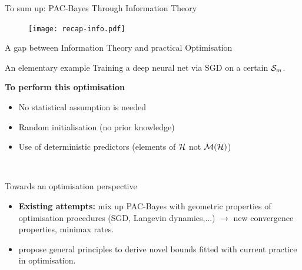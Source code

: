 \documentclass{presentation}
\begin{document}
\begin{xframe}{To sum up: PAC-Bayes Through Information Theory }
    \begin{figure}
        \centering
        \texttt{[image: recap-info.pdf]}
    \end{figure}
  \end{xframe}

\begin{xframe}{A gap between Information Theory and practical Optimisation}
    \begin{block}{An elementary example}
        Training a deep neural net via SGD on a certain $\mathcal{S}_m$.
    \end{block}
\vspace{0.5cm}
{\bf To perform this optimisation}
    \begin{itemize}
        \item No statistical assumption is needed
        \item Random initialisation (no prior knowledge)
        \item Use of deterministic predictors (elements of $\mathcal{H}$ not $\mathcal{M}(\mathcal{H})$)
    \end{itemize}
    \vspace{0.5cm}
    \\
    \vspace{0.5cm}
\end{xframe}

\begin{xframe}{Towards an optimisation perspective}
    \vspace{1cm}
    \begin{itemize}
        \item \textbf{Existing attempts:} mix up PAC-Bayes with geometric properties of optimisation procedures (SGD, Langevin dynamics,...)  \citep{london2017pac,dziugaite2018entropy,neu2021info,clerico2022generalisation,haghifam2023limit,zhou2023toward} $\rightarrow$ new convergence properties, minimax rates.
        \item {} propose general principles to derive novel bounds fitted with current practice in optimisation.
    \end{itemize}
    \vspace{0.5cm}


\end{xframe}
\end{document}
